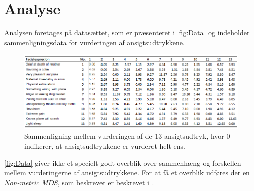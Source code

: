 \section*{Analyse}
\label{Analyse}
%
Analysen foretages på datasættet, som er præsenteret i \autoref{fig:Data} og indeholder sammenligningsdata for vurderingen af ansigtsudtrykkene. 
%
\begin{figure}[H]
\centering
\includegraphics[width = \textwidth]{Figure/Data.PNG} 
\caption{Sammenligning mellem vurderingen af de 13 ansigtsudtryk, hvor 0 indikerer, at ansigtsudtrykkene er vurderet helt ens.}
\label{fig:Data}
\end{figure}
\noindent
%
\autoref{fig:Data} giver ikke et specielt godt overblik over sammenhæng og forskellen mellem vurderingerne af ansigtsudtrykkene. For at få et overblik udføres der en \textit{Non-metric MDS}, som beskrevet er beskrevet i . 
\vfill
